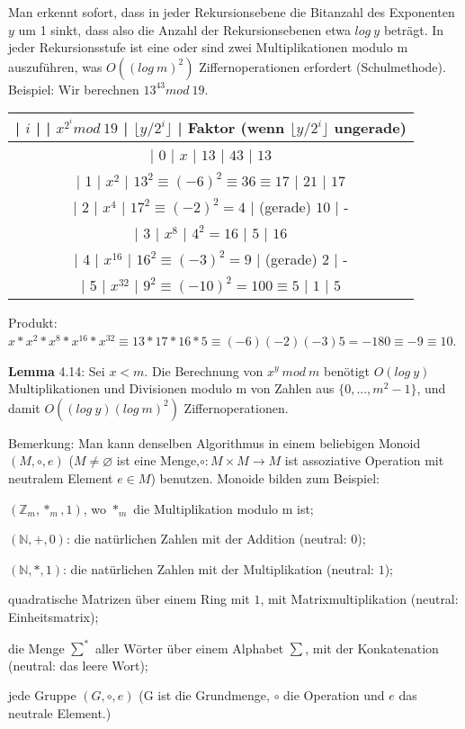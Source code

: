 \documentclass[a4paper]{article}
\begin{document}
\begin{multicols}{3}
    Man erkennt sofort, dass in jeder Rekursionsebene die Bitanzahl des Exponenten $y$ um 1 sinkt, dass also die Anzahl der Rekursionsebenen etwa $log\ y$ beträgt. In jeder Rekursionsstufe ist eine oder sind zwei Multiplikationen modulo m auszuführen, was $O((log\ m)^2)$ Ziffernoperationen erfordert (Schulmethode).
    Beispiel: Wir berechnen $13^{43} mod\ 19$.
    \begin{tabular}{c}
        | $i$ |     | $x^{2^i} mod\ 19$            | $\lfloor y/2^i\rfloor$ | Faktor (wenn $\lfloor y/2^i\rfloor$ ungerade) \\\hline
        | 0  | $x$   | $13$                  | $43$          | $13$                                                         \\
        | 1  | $x^2$  | $13^2 \equiv (-6)^2 \equiv 36\equiv 17$ | $21$          | $17$                                      \\
        | 2  | $x^4$  | $17^2 \equiv (-2)^2 = 4$        | (gerade) $10$     | -                                             \\
        | 3  | $x^8$  | $4^2 = 16$               | $5$          | $16$                                                      \\
        | 4  | $x^{16}$ | $16^2 \equiv (-3)^2 = 9$        | (gerade) $2$      | -                                           \\
        | 5  | $x^{32}$ | $9^2 \equiv (-10)^2 = 100\equiv 5$   | $1$          | $5$
    \end{tabular}

    Produkt: $x*x^2 *x^8 *x^{16} *x^{32} \equiv 13*17*16*5\equiv (-6)(-2)(-3)5 = -180\equiv -9\equiv 10$.

    \textbf{Lemma} 4.14: Sei $x<m$. Die Berechnung von $x^y\ mod\ m$ benötigt $O(log\ y)$ Multiplikationen und Divisionen modulo m von Zahlen aus $\{0,...,m^2-1\}$, und damit $O((log\ y)(log\ m)^2)$ Ziffernoperationen.

    Bemerkung: Man kann denselben Algorithmus in einem beliebigen Monoid $(M,\circ,e)$ ($M\not=\varnothing$ ist eine Menge,$\circ:M\times M \rightarrow M$ ist assoziative Operation mit neutralem Element $e\in M$) benutzen. Monoide bilden zum Beispiel:
    \begin{itemize*}
        \item $(\mathbb{Z}_m ,*_m,1)$, wo $*_m$ die Multiplikation modulo m ist;
        \item $(\mathbb{N},+,0)$: die natürlichen Zahlen mit der Addition (neutral: $0$);
        \item $(\mathbb{N},*,1)$: die natürlichen Zahlen mit der Multiplikation (neutral: $1$);
        \item quadratische Matrizen über einem Ring mit $1$, mit Matrixmultiplikation (neutral: Einheitsmatrix);
        \item die Menge $\sum^*$ aller Wörter über einem Alphabet $\sum$, mit der Konkatenation (neutral: das leere Wort);
        \item jede Gruppe $(G,\circ,e)$ (G ist die Grundmenge, $\circ$ die Operation und $e$ das neutrale Element.)
    \end{itemize*}


\end{multicols}
\end{document}

